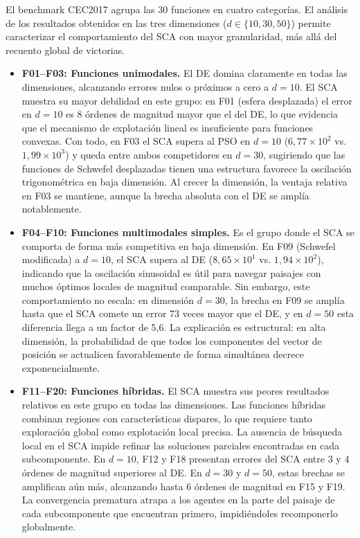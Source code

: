 \documentclass[12pt,a4paper]{article}
\begin{document}
El benchmark CEC2017 agrupa las 30 funciones en cuatro categorías. El análisis de los resultados obtenidos en las tres dimensiones ($d \in \{10, 30, 50\}$) permite caracterizar el comportamiento del SCA con mayor granularidad, más allá del recuento global de victorias.

\begin{itemize}
    \item \textbf{F01--F03: Funciones unimodales.} El DE domina claramente en todas las dimensiones, alcanzando errores nulos o próximos a cero a $d=10$. El SCA muestra su mayor debilidad en este grupo: en F01 (esfera desplazada) el error en $d=10$ es 8 órdenes de magnitud mayor que el del DE, lo que evidencia que el mecanismo de explotación lineal es insuficiente para funciones convexas. Con todo, en F03 el SCA supera al PSO en $d=10$ ($6{,}77 \times 10^2$ vs. $1{,}99 \times 10^3$) y queda entre ambos competidores en $d=30$, sugiriendo que las funciones de Schwefel desplazadas tienen una estructura favorece la oscilación trigonométrica en baja dimensión. Al crecer la dimensión, la ventaja relativa en F03 se mantiene, aunque la brecha absoluta con el DE se amplía notablemente.

    \item \textbf{F04--F10: Funciones multimodales simples.} Es el grupo donde el SCA se comporta de forma más competitiva en baja dimensión. En F09 (Schwefel modificada) a $d=10$, el SCA supera al DE ($8{,}65 \times 10^1$ vs. $1{,}94 \times 10^2$), indicando que la oscilación sinusoidal es útil para navegar paisajes con muchos óptimos locales de magnitud comparable. Sin embargo, este comportamiento no escala: en dimensión $d=30$, la brecha en F09 se amplía hasta que el SCA comete un error 73 veces mayor que el DE, y en $d=50$ esta diferencia llega a un factor de 5{,}6. La explicación es estructural: en alta dimensión, la probabilidad de que todos los componentes del vector de posición se actualicen favorablemente de forma simultánea decrece exponencialmente.

    \item \textbf{F11--F20: Funciones híbridas.} El SCA muestra sus peores resultados relativos en este grupo en todas las dimensiones. Las funciones híbridas combinan regiones con características dispares, lo que requiere tanto exploración global como explotación local precisa. La ausencia de búsqueda local en el SCA impide refinar las soluciones parciales encontradas en cada subcomponente. En $d=10$, F12 y F18 presentan errores del SCA entre 3 y 4 órdenes de magnitud superiores al DE. En $d=30$ y $d=50$, estas brechas se amplifican aún más, alcanzando hasta 6 órdenes de magnitud en F15 y F19. La convergencia prematura atrapa a los agentes en la parte del paisaje de cada subcomponente que encuentran primero, impidiéndoles recomponerlo globalmente.


\end{itemize}
\end{document}
